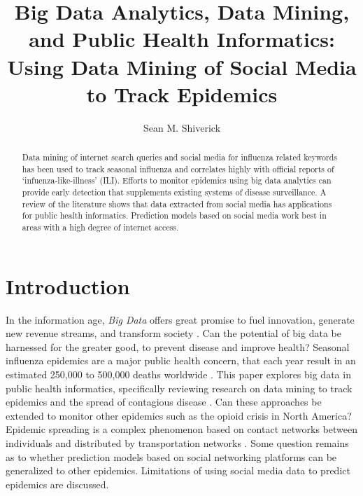 \documentclass[sigconf]{acmart}
\begin{document}
\title{Big Data Analytics, Data Mining, and Public Health Informatics: 
Using Data Mining of Social Media to Track Epidemics}
\author{Sean M. Shiverick}

\begin{abstract}

Data mining of internet search queries and social media for influenza related keywords 
has been used to track seasonal influenza and correlates highly with official reports 
of `infuenza-like-illness' (ILI). Efforts to monitor epidemics using big data analytics 
can provide early detection that supplements existing systems of disease surveillance. 
A review of the literature shows that data extracted from social media has applications 
for public health informatics. Prediction models based on social media work best in 
areas with a high degree of internet access.  

\end{abstract}


\maketitle

\section{Introduction}

In the information age, \textit{Big Data} offers great promise to fuel innovation, 
generate new revenue streams, and transform society \cite{gupta15}. Can the 
potential of big data be harnessed for the greater good, to prevent disease 
and improve health? Seasonal influenza epidemics are a major public health concern, 
that each year result in an estimated 250,000 to 500,000 deaths worldwide 
\cite{who17}. This paper explores big data in public health informatics, 
specifically reviewing research on data mining to track epidemics and the spread 
of contagious disease \cite{hay13}. Can these approaches be extended to monitor 
other epidemics such as the opioid crisis in North America? \cite{volkow14}
Epidemic spreading is a complex phenomenon based on contact networks between 
individuals and distributed by transportation networks \cite{Colizza06}. Some 
question remains as to whether prediction models based on social networking 
platforms can be generalized to other epidemics. Limitations of using social 
media data to predict epidemics are discussed.
\end{document}
